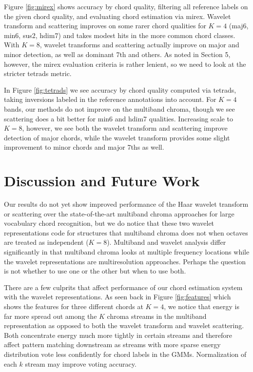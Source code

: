 \documentclass{article}
\begin{document}
Figure \ref{fig:mirex} shows accuracy by chord quality, filtering all reference labels on the given chord quality, and evaluating chord estimation via mirex. Wavelet transform and scattering improves on some rarer chord qualities for $K=4$ (maj6, min6, sus2, hdim7) and takes modest hits in the more common chord classes. With $K=8$, wavelet transforms and scattering actually improve on major and minor detection, as well as dominant 7th and others. As noted in Section 5, however, the mirex evaluation criteria is rather lenient, so we need to look at the stricter tetrads metric.

In Figure \ref{fig:tetrads} we see accuracy by chord quality computed via tetrads, taking inversions labeled in the reference annotations into account. For $K=4$ bands, our methods do not improve on the multiband chroma, though we see scattering does a bit better for min6 and hdim7 qualities. Increasing scale to $K=8$, however, we see both the wavelet transform and scattering improve detection of major chords, while the wavelet transform provides some slight improvement to minor chords and major 7ths as well. 
	

\section{Discussion and Future Work}\label{sec:conclusion}

Our results do not yet show improved performance of the Haar wavelet transform or scattering over the state-of-the-art multiband chroma approaches for large vocabulary chord recognition, but we do notice that these two wavelet representations code for structures that multiband chroma does not when octaves are treated as independent ($K=8$). Multiband and wavelet analysis differ significantly in that multiband chroma looks at multiple frequency locations while the wavelet representations are multiresolution approaches. Perhaps the question is not whether to use one or the other but when to use both.

There are a few culprits that affect performance of our chord estimation system with the wavelet representations. As seen back in Figure \ref{fig:features} which shows the features for three different chords at $K=4$, we notice that energy is far more spread out among the $K$ chroma streams in the multiband representation as opposed to both the wavelet transform and wavelet scattering. Both concentrate energy much more tightly in certain streams and therefore affect pattern matching downstream as streams with more sparse energy distribution vote less confidently for chord labels in the GMMs. Normalization of each $k$ stream may improve voting accuracy.
\end{document}
